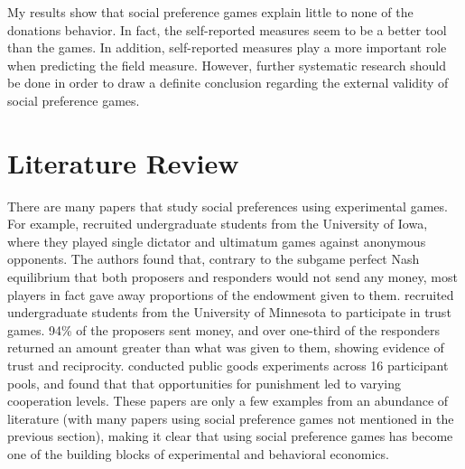 \documentclass[12pt]{article}
\begin{document}
My results show that social preference games explain little to none of the donations behavior. In fact, the self-reported measures seem to be a better tool than the games. In addition, self-reported measures play a more important role when predicting the field measure. However, further systematic research should be done in order to draw a definite conclusion regarding the external validity of social preference games. 


\section{Literature Review}

There are many papers that study social preferences using experimental games. For example, \cite{forsythe_1994} recruited undergraduate students from the University of Iowa, where they played single dictator and ultimatum games against anonymous opponents. The authors found that, contrary to the subgame perfect Nash equilibrium that both proposers and responders would not send any money, most players in fact gave away proportions of the endowment given to them. \cite{berg_1995} recruited undergraduate students from the University of Minnesota to participate in trust games. 94\% of the proposers sent money, and over one-third of the responders returned an amount greater than what was given to them, showing evidence of trust and reciprocity. \cite{hermann_thoni_gachter_2008} conducted public goods experiments across 16 participant pools, and found that that opportunities for punishment led to varying cooperation levels. These papers are only a few examples from an abundance of literature (with many papers using social preference games not mentioned in the previous section), making it clear that using social preference games has become one of the building blocks of experimental and behavioral economics. 
 
\end{document}

